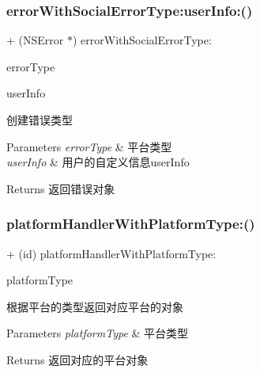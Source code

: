\subsubsection{\texorpdfstring{error\+With\+Social\+Error\+Type\+:user\+Info\+:()}{errorWithSocialErrorType:userInfo:()}\hspace{0.1cm}{\footnotesize\ttfamily [2/2]}}
{\footnotesize\ttfamily + (N\+S\+Error $\ast$) error\+With\+Social\+Error\+Type\+: \begin{DoxyParamCaption}\item[{(U\+M\+Social\+Platform\+Error\+Type)}]{error\+Type }\item[{userInfo:(id)}]{user\+Info }\end{DoxyParamCaption}}

创建错误类型


\begin{DoxyParams}{Parameters}
{\em error\+Type} & 平台类型 \\
\hline
{\em user\+Info} & 用户的自定义信息user\+Info\\
\hline
\end{DoxyParams}
\begin{DoxyReturn}{Returns}
返回错误对象 
\end{DoxyReturn}
\mbox{\label{interface_u_m_social_platform_config_a466845145ae4dcbcb667ef4c31edc989}} 
\subsubsection{\texorpdfstring{platform\+Handler\+With\+Platform\+Type\+:()}{platformHandlerWithPlatformType:()}\hspace{0.1cm}{\footnotesize\ttfamily [1/2]}}
{\footnotesize\ttfamily + (id) platform\+Handler\+With\+Platform\+Type\+: \begin{DoxyParamCaption}\item[{(U\+M\+Social\+Platform\+Type)}]{platform\+Type }\end{DoxyParamCaption}}

根据平台的类型返回对应平台的对象


\begin{DoxyParams}{Parameters}
{\em platform\+Type} & 平台类型\\
\hline
\end{DoxyParams}
\begin{DoxyReturn}{Returns}
返回对应的平台对象 
\end{DoxyReturn}
\mbox{\label{interface_u_m_social_platform_config_a466845145ae4dcbcb667ef4c31edc989}} 
